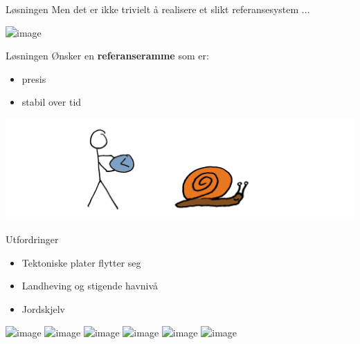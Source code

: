 \documentclass[12pt,table,t]{beamer}
\begin{document}
\begin{frame}[c]{Løsningen}
  Men det er ikke trivielt å realisere et slikt referansesystem ... 

  \vspace*{4ex}
  \begin{center}
    \includegraphics<1>[width=\textwidth]{figure/origin}
  \end{center}
\end{frame}


\begin{frame}[c]{Løsningen}
  Ønsker en \textbf{referanseramme} som er:

  \begin{itemize}
  \item<2-> presis
  \item<3-> stabil over tid
  \end{itemize}

  \begin{center}
    \includegraphics[width=\textwidth]{figure/time}
  \end{center}
\end{frame}


\begin{frame}[c]{Utfordringer}

  \begin{itemize}
  \item<2-> Tektoniske plater flytter seg
  \item<3-> Landheving og stigende havnivå
  \item<4-> Jordskjelv
  \end{itemize}
  
  \begin{center}
    \includegraphics<-1>[width=.3\textwidth]{figure/earth_sq}
    \includegraphics<2->[width=.3\textwidth]{figure/plate_drift_sq}
    \includegraphics<-2>[width=.3\textwidth]{figure/earth_sq}
    \includegraphics<3->[width=.3\textwidth]{figure/uplift}
    \includegraphics<-3>[width=.3\textwidth]{figure/earth_sq}
    \includegraphics<4->[width=.3\textwidth]{figure/earthquake_sq}
  \end{center}
\end{frame}
\end{document}
